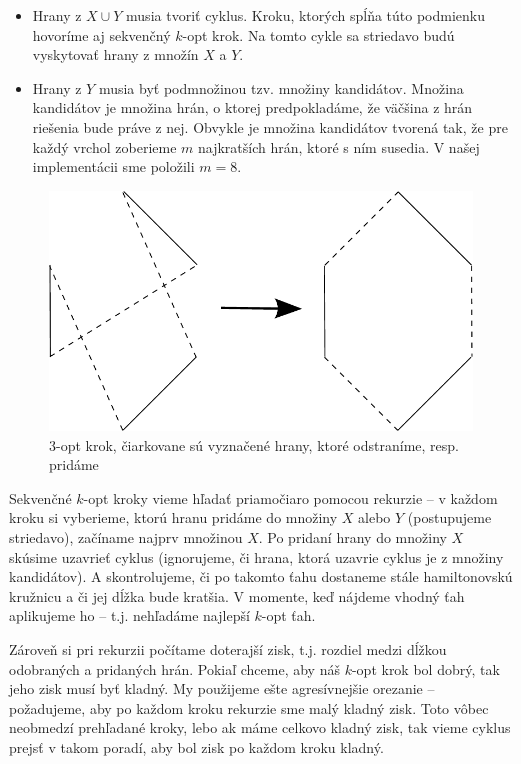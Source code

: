 \begin{itemize}
\item Hrany z $X \cup Y$ musia tvoriť cyklus. Kroku, ktorých spĺňa túto podmienku
hovoríme aj sekvenčný $k$-opt krok. Na tomto cykle sa striedavo budú vyskytovať hrany z množín
$X$ a $Y$.
\item Hrany z $Y$ musia byť podmnožinou tzv. množiny kandidátov. Množina kandidátov je množina hrán,
o ktorej predpokladáme, že väčšina z hrán riešenia bude práve z nej. Obvykle je množina kandidátov
tvorená tak, že pre každý vrchol zoberieme $m$ najkratších hrán, ktoré s ním susedia. V našej
implementácii sme položili $m = 8$.
\end{itemize}

\begin{figure}[h]
\centering
\includegraphics[scale=0.6]{img/opt3.pdf}
\caption{3-opt krok, čiarkovane sú vyznačené hrany, ktoré odstraníme, resp. pridáme}
\end{figure}


Sekvenčné $k$-opt kroky vieme hľadať priamočiaro pomocou rekurzie -- v každom kroku si vyberieme,
ktorú hranu pridáme do množiny $X$ alebo $Y$ (postupujeme striedavo), začíname najprv množinou $X$.
Po pridaní hrany do množiny $X$ skúsime uzavrieť cyklus (ignorujeme, či hrana, ktorá uzavrie
cyklus je z množiny kandidátov). A skontrolujeme, či po takomto ťahu dostaneme stále hamiltonovskú
kružnicu a či jej dĺžka bude kratšia. V momente, keď nájdeme vhodný ťah aplikujeme ho -- t.j.
nehľadáme najlepší $k$-opt ťah.

Zároveň si pri rekurzii počítame doterajší zisk, t.j. rozdiel medzi dĺžkou odobraných a pridaných hrán.
Pokiaľ chceme, aby náš $k$-opt krok bol dobrý, tak jeho zisk musí byť kladný. My použijeme ešte
agresívnejšie orezanie -- požadujeme, aby po každom kroku rekurzie sme malý kladný zisk. Toto vôbec
neobmedzí prehľadané kroky, lebo ak máme celkovo kladný zisk, tak vieme cyklus prejsť v takom
poradí, aby bol zisk po každom kroku kladný.

